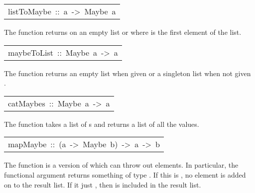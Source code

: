 \begin{haddockdesc}
\item[\begin{tabular}{@{}l}
listToMaybe\ ::\ {\char 91}a{\char 93}\ ->\ Maybe\ a
\end{tabular}]\haddockbegindoc
The  function returns  on an empty list
 or  where  is the first element of the list.
\par

\end{haddockdesc}
\begin{haddockdesc}
\item[\begin{tabular}{@{}l}
maybeToList\ ::\ Maybe\ a\ ->\ {\char 91}a{\char 93}
\end{tabular}]\haddockbegindoc
The  function returns an empty list when given
  or a singleton list when not given .
\par

\end{haddockdesc}
\begin{haddockdesc}
\item[\begin{tabular}{@{}l}
catMaybes\ ::\ {\char 91}Maybe\ a{\char 93}\ ->\ {\char 91}a{\char 93}
\end{tabular}]\haddockbegindoc
The  function takes a list of s and returns
 a list of all the  values. 
\par

\end{haddockdesc}
\begin{haddockdesc}
\item[\begin{tabular}{@{}l}
mapMaybe\ ::\ (a\ ->\ Maybe\ b)\ ->\ {\char 91}a{\char 93}\ ->\ {\char 91}b{\char 93}
\end{tabular}]\haddockbegindoc
The  function is a version of  which can throw
 out elements.  In particular, the functional argument returns
 something of type .  If this is , no element
 is added on to the result list.  If it just , then  is
 included in the result list.
\par

\end{haddockdesc}
